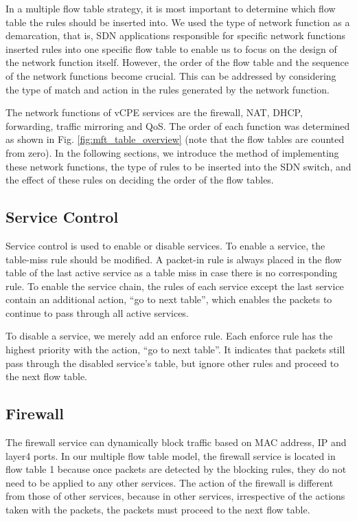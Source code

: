 \documentclass[conference]{IEEEtran}
\begin{document}
In a multiple flow table strategy, it is most important to determine which flow table the rules should be inserted into. We used the type of network function as a demarcation, that is, SDN applications responsible for specific network functions inserted rules into one specific flow table to enable us to focus on the design of the network function itself. However, the order of the flow table and the sequence of the network functions become crucial. This can be addressed by considering the type of match and action in the rules generated by the network function.

The network functions of vCPE services are the firewall, NAT, DHCP, forwarding, traffic mirroring and QoS. The order of each function was determined as shown in Fig. \ref{fig:mft_table_overview} (note that the flow tables are counted from zero). In the following sections, we introduce the method of implementing these network functions, the type of rules to be inserted into the SDN switch, and the effect of these rules on deciding the order of the flow tables.



\subsection{Service Control}
Service control is used to enable or disable services. To enable a service, the table-miss rule should be modified. A packet-in rule is always placed in the flow table of the last active service as a table miss in case there is no corresponding rule. To enable the service chain, the rules of each service except the last service contain an additional action, ``go to next table'', which enables the packets to continue to pass through all active services.

To disable a service, we merely add an enforce rule. Each enforce rule has the highest priority with the action, ``go to next table''. It indicates that packets still pass through the disabled service’s table, but ignore other rules and proceed to the next flow table.



\subsection{Firewall}
The firewall service can dynamically block traffic based on MAC address, IP and layer4 ports.
In our multiple flow table model, the firewall service is located in flow table 1 because once packets are detected by the blocking rules, they do not need to be applied to any other services.
The action of the firewall is different from those of other services, because in other services, irrespective of the actions taken with the packets, the packets must proceed to the next flow table.
\end{document}
